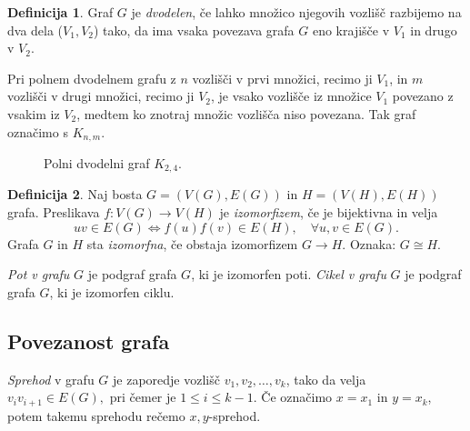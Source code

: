 \documentclass[12pt,a4paper]{amsart}
\theoremstyle{definition} %
\newtheorem{definicija}{Definicija}[section]
\theoremstyle{plain} %
\newcommand{\N}{\mathbb N}
\newcommand{\graf}[1][G]{\ensuremath{#1 = (V(#1), E(#1))}}
\newcommand{\vozlisca}[1][G]{\ensuremath{V(#1)}}
\newcommand{\povezave}[1][G]{\ensuremath{E(#1)}}
\begin{document}
\begin{definicija}
    Graf $G$ je \emph{dvodelen}, če lahko množico njegovih vozlišč razbijemo na dva dela ($V_1,V_2$) tako, da ima vsaka povezava grafa $G$ eno krajišče v $V_1$ in drugo v $V_2$.
\end{definicija}

Pri polnem dvodelnem grafu z $n$ vozlišči v prvi množici, recimo ji $V_1$, in $m$ vozlišči v drugi množici, recimo ji $V_2$, je vsako vozlišče iz množice $V_1$ povezano z vsakim iz $V_2$, medtem ko znotraj množic vozlišča niso povezana. Tak graf označimo s $K_{n,m}$.

\begin{figure}[h]
    \caption{Polni dvodelni graf $K_{2,4}$.}
\end{figure}

\begin{definicija}
	Naj bosta $\graf$ in $\graf[H]$ grafa. 
	Preslikava $f\colon \vozlisca \to \vozlisca[H]$ je \emph{izomorfizem}, če je bijektivna in velja
	\[ uv \in \povezave \iff f(u)f(v) \in \povezave[H],\quad \forall u, v \in \povezave. \]
	Grafa $G$ in $H$ sta \emph{izomorfna}, če obstaja izomorfizem $G \to H$. Oznaka: $G \cong H$.
\end{definicija}

\emph{Pot v grafu} $G$ je podgraf grafa $G$, ki je izomorfen poti.
\emph{Cikel v grafu} $G$ je podgraf grafa $G$, ki je izomorfen ciklu. 

\subsection{Povezanost grafa}

\emph{Sprehod} v grafu $G$ je zaporedje vozlišč $v_1, v_2, \ldots, v_k$, tako da velja $v_i v_{i+1} \in E(G),$ pri čemer je $1 \leq i \leq k-1$. Če označimo $x = x_1$ in $y = x_k$, potem takemu sprehodu rečemo $x,y$-sprehod.
\end{document}
